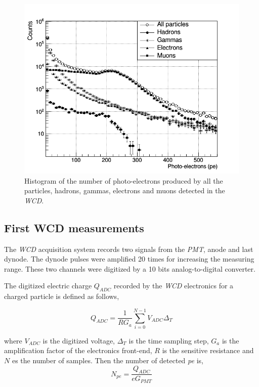 \documentclass[submitting]{nst}
\begin{document}
\begin{figure}
    \centering
    \includegraphics[scale=0.4]{Figures/flux.png}
    \caption{Histogram of the number of photo-electrons produced by all the particles, hadrons, gammas, electrons and muons detected in the \textsl{WCD}.}
    \label{fig:flux}
\end{figure}

\subsection{First WCD measurements}\label{sec:wcd-data}%

The \textsl{WCD} acquisition system records two signals from the \textsl{PMT}, anode and last dynode. The dynode pulses were amplified 20 times for increasing the measuring range. These two channels were digitized by a 10 bits analog-to-digital converter.

The digitized electric charge $Q_{ADC}$ recorded by the \textsl{WCD} electronics for a charged particle is defined as follows,

\begin{equation}
\label{n_FE}
Q_{ADC} =  \frac{1}{RG_{a}}\sum_{i=0}^{N-1} V_{ADC} \Delta_T
\end{equation}

where $V_{ADC}$ is the digitized voltage, $\Delta_T$ is the time sampling step, $G_a$ is the amplification factor of the electronics front-end, $R$ is the sensitive resistance and $N$ es the number of samples. Then the number of detected \textsl{pe} is,
\begin{equation}
\label{n_FE}
N_{pe} = \frac{Q_{ADC}}{eG_{PMT}}
\end{equation}
\end{document}
